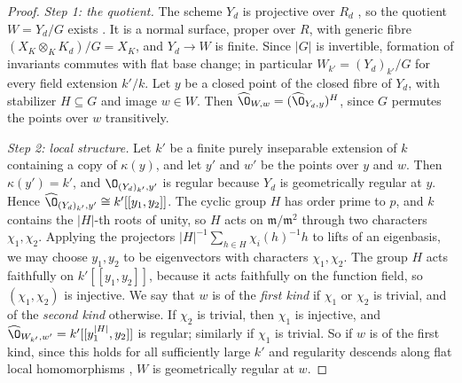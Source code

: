\begin{proof}
\emph{Step 1: the quotient.}
The scheme $Y_d$ is projective over $R_d$ \cite[Tag~]{Stacks}, so the quotient $W = Y_d/G$ exists \cite[Exp.~V, Proposition~1.8]{SGA1}.
It is a normal surface, proper over $R$, with generic fibre $(X_K\otimes_KK_d)/G = X_K$, and $Y_d\to W$ is finite.
Since $\lvert G\rvert$ is invertible, formation of invariants commutes with flat base change; in particular $W_{k'} = (Y_d)_{k'}/G$ for every field extension $k'/k$.
Let $y$ be a closed point of the closed fibre of $Y_d$, with stabilizer $H\subseteq G$ and image $w\in W$.
Then $\widehat\O_{W,w} = (\widehat\O_{Y_d,y})^H$, since $G$ permutes the points over $w$ transitively.

\emph{Step 2: local structure.}
Let $k'$ be a finite purely inseparable extension of $k$ containing a copy of $\kappa(y)$, and let $y'$ and $w'$ be the points over $y$ and $w$.
Then $\kappa(y') = k'$, and $\O_{(Y_d)_{k'},y'}$ is regular because $Y_d$ is geometrically regular at $y$.
Hence $\widehat\O_{(Y_d)_{k'},y'}\cong k'[[y_1,y_2]]$.
The cyclic group $H$ has order prime to $p$, and $k$ contains the $\lvert H\rvert$-th roots of unity, so $H$ acts on $\mathfrak m/\mathfrak m^2$ through two characters $\chi_1,\chi_2$.
Applying the projectors $\lvert H\rvert^{-1}\sum_{h\in H}\chi_i(h)^{-1}h$ to lifts of an eigenbasis, we may choose $y_1,y_2$ to be eigenvectors with characters $\chi_1,\chi_2$.
The group $H$ acts faithfully on $k'[[y_1,y_2]]$, because it acts faithfully on the function field, so $(\chi_1,\chi_2)$ is injective.
We say that $w$ is of the \emph{first kind} if $\chi_1$ or $\chi_2$ is trivial, and of the \emph{second kind} otherwise.
If $\chi_2$ is trivial, then $\chi_1$ is injective, and $\widehat\O_{W_{k'},w'} = k'[[y_1^{\lvert H\rvert},y_2]]$ is regular; similarly if $\chi_1$ is trivial.
So if $w$ is of the first kind, since this holds for all sufficiently large $k'$ and regularity descends along flat local homomorphisms \cite[Tag~]{Stacks}, $W$ is geometrically regular at $w$.


\end{proof}
